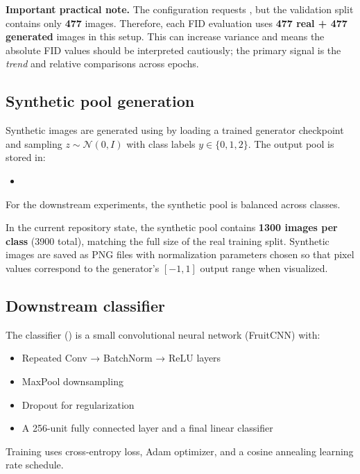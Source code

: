 \textbf{Important practical note.} The configuration requests , but the validation split contains only \textbf{477} images. Therefore, each FID evaluation uses \textbf{477 real + 477 generated} images in this setup. This can increase variance and means the absolute FID values should be interpreted cautiously; the primary signal is the \emph{trend} and relative comparisons across epochs.

\subsection{Synthetic pool generation}

Synthetic images are generated using  by loading a trained generator checkpoint and sampling \(z \sim \mathcal{N}(0, I)\) with class labels \(y \in \{0,1,2\}\). The output pool is stored in:
\begin{itemize}
\item {}
\end{itemize}

For the downstream experiments, the synthetic pool is balanced across classes.

In the current repository state, the synthetic pool contains \textbf{1300 images per class} (3900 total), matching the full size of the real training split. Synthetic images are saved as PNG files with normalization parameters chosen so that pixel values correspond to the generator's \([-1,1]\) output range when visualized.

\subsection{Downstream classifier}

The classifier () is a small convolutional neural network (FruitCNN) with:
\begin{itemize}
\item Repeated Conv → BatchNorm → ReLU layers
\item MaxPool downsampling
\item Dropout for regularization
\item A 256-unit fully connected layer and a final linear classifier
\end{itemize}

Training uses cross-entropy loss, Adam optimizer, and a cosine annealing learning rate schedule.

